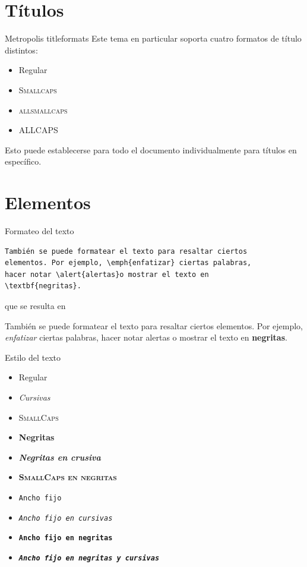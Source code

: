 \documentclass[10pt]{beamer}
\begin{document}
\section{Títulos}
\begin{frame}{Metropolis titleformats}
Este tema en particular soporta cuatro formatos de título distintos:
    \begin{itemize}
        \item Regular
        \item \textsc{Smallcaps}
        \item \textsc{allsmallcaps}
        \item ALLCAPS
    \end{itemize}
Esto puede establecerse para todo el documento individualmente para títulos en específico.
\end{frame}

\section{Elementos}

\begin{frame}[fragile]{Formateo del texto}
\begin{verbatim}
También se puede formatear el texto para resaltar ciertos
elementos. Por ejemplo, \emph{enfatizar} ciertas palabras,
hacer notar \alert{alertas}o mostrar el texto en
\textbf{negritas}.
\end{verbatim}

\begin{center}que se resulta en\end{center}
También se puede formatear el texto para resaltar ciertos elementos. Por ejemplo, \emph{enfatizar} ciertas palabras, hacer notar \alert{alertas} o mostrar el texto en \textbf{negritas}.
\end{frame}

\begin{frame}{Estilo del texto}
  \begin{itemize}
    \item Regular
    \item \textit{Cursivas}
    \item \textsc{SmallCaps}
    \item \textbf{Negritas}
    \item \textbf{\textit{Negritas en crusiva}}
    \item \textbf{\textsc{SmallCaps en negritas}}
    \item \texttt{Ancho fijo}
    \item \texttt{\textit{Ancho fijo en cursivas}}
    \item \texttt{\textbf{Ancho fijo en negritas}}
    \item \texttt{\textbf{\textit{Ancho fijo en negritas y cursivas}}}
  \end{itemize}
\end{frame}
\end{document}
